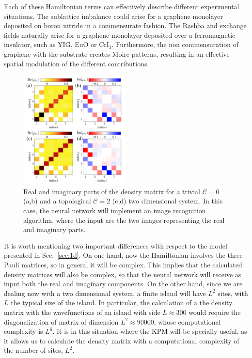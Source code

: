 Each of these Hamiltonian terms can effectively describe different experimental
situations. The sublattice imbalance could arise for a graphene monolayer
deposited on boron nitride in a commensurate
fashion.\cite{wang2016gaps,Lado2013}
The Rashba and exchange fields naturally arise for a graphene monolayer
deposited over a ferromagnetic insulator, such as
YIG,\cite{tang2017approaching,PhysRevLett.114.016603}
EuO\cite{PhysRevB.95.075418} or
CrI$_3$.\cite{huang2017layer,zhang2017strong}
Furthermore, the non commensuration of graphene with the substrate creates Moire
patterns, resulting in an effective spatial modulation of the different
contributions.\cite{PhysRevB.90.075428,PhysRevB.96.085442,wang2016gaps}


\begin{figure}[t!]
\centering
\includegraphics[width=0.5\textwidth]{ann/figures/fig5.pdf}
\caption{
Real and imaginary parts of the density matrix for a trivial $\mathcal{C}=0$ (a,b)
and a topological $\mathcal{C}=2$ (c,d) two dimensional system.
In this case, the neural network will implement an image recognition algorithm,
where the input are the two images representing the real and imaginary parts.
}
\label{fig5}
\end{figure}


It is worth mentioning two important differences with respect to the model
presented in Sec.~\ref{sec:1d}. On one hand, now the Hamiltonian involves the
three Pauli matrices, so in general it will be complex. This implies that the
calculated density matrices will also be complex, so that the neural network
will receive as input both the real and imaginary components.
On the other hand, since we are dealing now with a two dimensional system, a
finite island will have $L^2$ sites, with $L$ the typical size of the island.
In particular, the calculation of a the density matrix with the wavefunctions of
an island with side $L\approx 300$ would require the diagonalization of matrix
of dimension $L^2\approx 90000$, whose computational complexity is $L^6$. It is
in this situation where the KPM will be specially useful, as it allows us to
calculate the density matrix with a computational complexity of the number of
sites, $L^2$.


